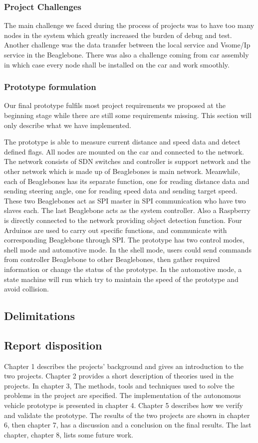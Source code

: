 \documentclass[11pt, titlepage]{article} %
\begin{document}
\subsubsection{Project Challenges}
The main challenge we faced during the process of projects was to have too many nodes in the system which greatly increased the burden of debug and test. Another challenge was the data transfer between the local service and Vsome/Ip service in the Beaglebone. There was also a challenge coming from car assembly in which case every node shall be installed on the car and work smoothly. 

\subsubsection{Prototype formulation}
Our final prototype fulfils most project requirements we proposed at the beginning stage while there are still some requirements missing. This section will only describe what we have implemented.

The prototype is able to measure current distance and speed data and detect defined flags. All nodes are mounted on the car and connected to the network. The network consists of SDN switches and controller is support network and the other network which is made up of Beaglebones is main network. Meanwhile, each of Beaglebones has its separate function, one for reading distance data and sending steering angle, one for reading speed data and sending target speed. These two Beaglebones act as SPI master in SPI communication who have two slaves each. The last Beaglebone acts as the system controller. Also a Raspberry is directly connected to the network providing object detection function. Four Arduinos are used to carry out specific functions, and communicate with corresponding Beaglebone through SPI.
The prototype has two control modes, shell mode and automotive mode. In the shell mode, users could send commands from controller Beaglebone to other Beaglebones, then gather required information or change the status of the prototype. In the automotive mode, a state machine will run which try to maintain the speed of the prototype and avoid collision. 


\subsection{Delimitations}

\subsection{Report disposition}
Chapter 1 describes the projects' background and gives an introduction to the two projects. Chapter 2 provides a short description of theories used in the projects. In chapter 3, The methods, tools and techniques used to solve the problems in the project are specified. The implementation of the autonomous vehicle prototype is presented in chapter 4. Chapter 5 describes how we verify and validate the prototype. The results of the two projects are shown in chapter 6, then chapter 7, has a discussion and a conclusion on the final results. The last chapter, chapter 8, lists some future work.  
\clearpage
\end{document}
